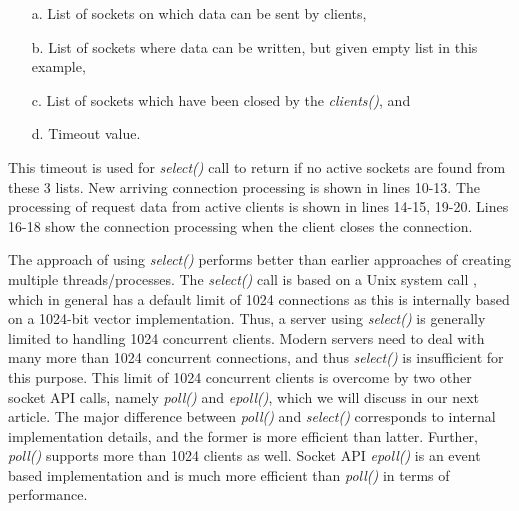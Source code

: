 \begin{multicols}{2}
\vspace{-.5cm}

\begin{itemize}

\setlength{\parskip}{0pt}
  \setlength{\itemsep}{0pt plus 6pt}

\item[\rm a.] List of sockets on which data can be sent by clients,

\item[\rm b.] List of sockets where data can be written, but given empty list in this example,

\item[\rm c.] List of sockets which have been closed by the \textit{clients()}, and

\item[\rm d.] Timeout value.

\end{itemize}

This timeout is used for \textit{select()} call to return if no active sockets are found from these 3 lists. New arriving connection processing is shown in lines 10-13. The processing of request data from active clients is shown in lines 14-15, 19-20. Lines 16-18 show the connection processing when the client closes the connection.

The approach of using \textit{select()} performs better than earlier approaches of creating multiple threads/processes. The \textit{select()} call is based on a Unix system call \cite{art1-key19}\cite{art1-key20}, which in general has a default limit of 1024 connections as this is internally based on a 1024-bit vector implementation. Thus, a server using \textit{select()} is generally limited to handling 1024 concurrent clients. Modern servers need to deal with many more than 1024 concurrent connections, and thus \textit{select()} is insufficient for this purpose. This limit of 1024 concurrent clients is overcome by two other socket API calls, namely \textit{poll()} and \textit{epoll()}, which we will discuss in our next article. The major difference between \textit{poll()} and \textit{select()} corresponds to internal implementation details, and the former is more efficient than latter. Further, \textit{poll()} supports more than 1024 clients as well. Socket API \textit{epoll()} is an event based implementation and is much more efficient than \textit{poll()} in terms of performance.

\vspace{-.5cm}


\end{multicols}
